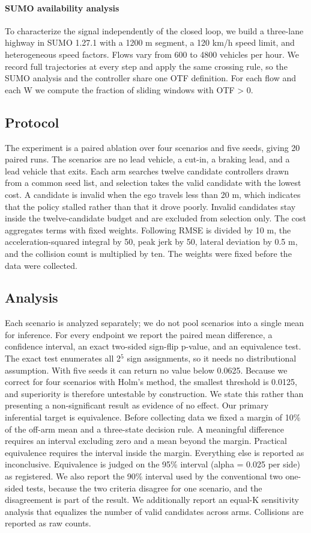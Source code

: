 \documentclass[journal]{IEEEtran}
\begin{document}
\paragraph{SUMO availability analysis}
To characterize the signal independently of the closed loop, we build
a three-lane highway in SUMO 1.27.1 with a 1200 m segment, a 120 km/h speed limit, and heterogeneous
speed factors. Flows vary from 600 to 4800 vehicles per hour. We record full trajectories at every
step and apply the same crossing rule, so the SUMO analysis and the controller share one OTF
definition. For each flow and each W we compute the fraction of sliding windows with OTF > 0.
\subsection{Protocol}
The experiment is a paired ablation over four scenarios and five seeds, giving 20 paired runs. The
scenarios are no lead vehicle, a cut-in, a braking lead, and a lead vehicle that exits. Each arm
searches twelve candidate controllers drawn from a common seed list, and selection takes the valid
candidate with the lowest cost. A candidate is invalid when the ego travels less than 20 m, which
indicates that the policy stalled rather than that it drove poorly. Invalid candidates stay inside the
twelve-candidate budget and are excluded from selection only.
The cost aggregates terms with fixed weights. Following RMSE is divided by 10 m, the
acceleration-squared integral by 50, peak jerk by 50, lateral deviation by 0.5 m, and the collision
count is multiplied by ten. The weights were fixed before the data were collected.
\subsection{Analysis}
Each scenario is analyzed separately; we do not pool scenarios into a single mean for inference. For
every endpoint we report the paired mean difference, a confidence interval, an exact two-sided
sign-flip p-value, and an equivalence test.
The exact test enumerates all 2$^{5}$ sign assignments, so it needs no distributional assumption. With five
seeds it can return no value below 0.0625. Because we correct for four scenarios with Holm's method,
the smallest threshold is 0.0125, and superiority is therefore untestable by construction. We state
this rather than presenting a non-significant result as evidence of no effect.
Our primary inferential target is equivalence. Before collecting data we fixed a margin of 10\% of the
off-arm mean and a three-state decision rule. A meaningful difference requires an interval excluding
zero and a mean beyond the margin. Practical equivalence requires the interval inside the margin.
Everything else is reported as inconclusive. Equivalence is judged on the 95\% interval (alpha = 0.025
per side) as registered. We also report the 90\% interval used by the conventional two one-sided tests,
because the two criteria disagree for one scenario, and the disagreement is part of the result.
We additionally report an equal-K sensitivity analysis that equalizes the number of valid candidates
across arms. Collisions are reported as raw counts.
\end{document}
